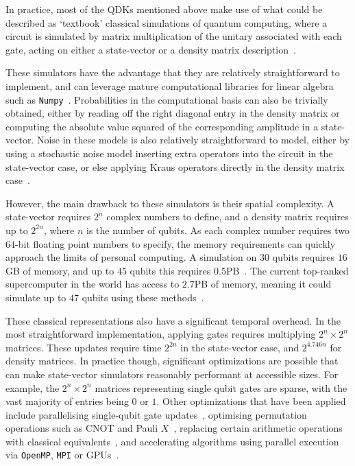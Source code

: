 In practice, most of the QDKs mentioned above make use of what could be described as `textbook' classical simulations of quantum computing, where a circuit is simulated by matrix multiplication of the unitary associated with each gate, acting on either a state-vector or a density matrix description~\cite{Nielsen2000}.\par
These simulators have the advantage that they are relatively straightforward to implement, and can leverage mature computational libraries for linear algebra such as \texttt{Numpy}~\cite{Numpy}. Probabilities in the computational basis can also be trivially obtained, either by reading off the right diagonal entry in the density matrix or computing the absolute value squared of the corresponding amplitude in a state-vector. Noise in these models is also relatively straightforward to model, either by using a stochastic noise model inserting extra operators into the circuit in the state-vector case, or else applying Kraus operators directly in the density matrix case~\cite{Nielsen2000}.\par
However, the main drawback to these simulators is their spatial complexity. A state-vector requires $2^{n}$ complex numbers to define, and a density matrix requires up to $2^{2n}$, where $n$ is the number of qubits. As each complex number requires two $64$-bit floating point numbers to specify, the memory requirements can quickly approach the limits of personal computing. A simulation on $30$ qubits requires $16$GB of memory, and up to $45$ qubits this requires $0.5$PB~\cite{Haner2016}. The current top-ranked supercomputer in the world has access to $2.7$PB of memory, meaning it could simulate up to $47$ qubits using these methods~\cite{Top500}.\par
These classical representations also have a significant temporal overhead. In the most straightforward implementation, applying gates requires multiplying $2^{n}\times 2^{n}$ matrices. These updates require time $2^{2n}$ in the state-vector case, and $2^{4.746n}$ for density matrices. In practice though, significant optimizations are possible that can make state-vector simulators reasonably performant at accessible sizes. For example, the $2^{n}\times 2^{n}$ matrices representing single qubit gates are sparse, with the vast  majority of entries being $0$ or $1$. Other optimizations that have been applied include parallelising single-qubit gate updates~\cite{Smelyanskiy2016,Khammassi2017,QiskitAer}, optimising permutation operations such as CNOT and Pauli $X$~\cite{Khammassi2017}, replacing certain arithmetic operations with classical equivalents~\cite{Haner2016}, and accelerating algorithms using parallel execution via \texttt{OpenMP}, \texttt{MPI} or GPUs~\cite{Smelyanskiy2016,Khammassi2017,QiskitAer,Jones2018}.\par
